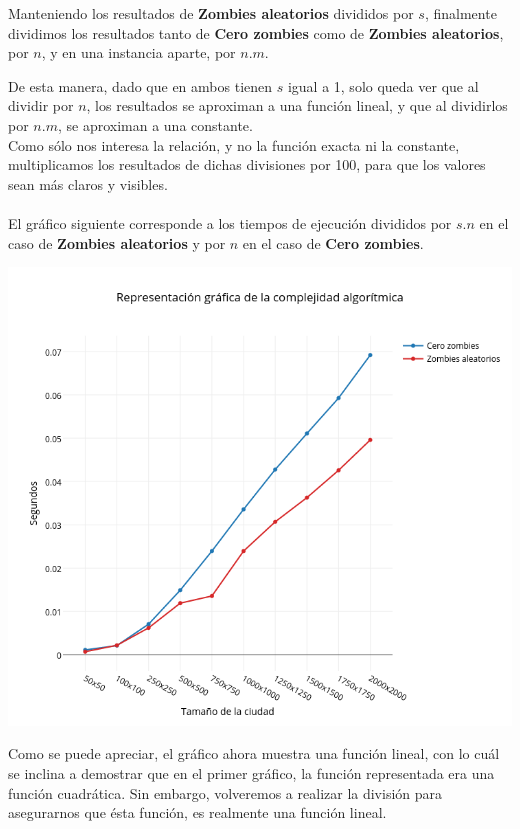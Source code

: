 \newpage

Manteniendo los resultados de \textbf{Zombies aleatorios} divididos por $s$, finalmente dividimos los resultados tanto de \textbf{Cero zombies} como de \textbf{Zombies aleatorios}, por $n$, y en una instancia aparte, por $n.m$.

De esta manera, dado que en ambos tienen $s$ igual a 1, solo queda ver que al dividir por $n$, los resultados se aproximan a una función lineal, y que al dividirlos por $n.m$, se aproximan a una constante.\\

Como s\'olo nos interesa la relación, y no la función exacta ni la constante, multiplicamos los resultados de dichas divisiones por 100, para que los valores sean más claros y visibles.\\
\\

El gr\'afico siguiente corresponde a los tiempos de ejecuci\'on divididos por $s.n$ en el caso de \textbf{Zombies aleatorios}  y por $n$ en el caso de \textbf{Cero zombies}.

\includegraphics[width=15cm,keepaspectratio=yes]{imagenes/ej2/linealizacion.png}

Como se puede apreciar, el gráfico ahora muestra una función lineal, con lo cuál se inclina a demostrar que en el primer gráfico, la función representada era una función cuadrática.
Sin embargo, volveremos a realizar la división para asegurarnos que ésta función, es realmente una función lineal.

